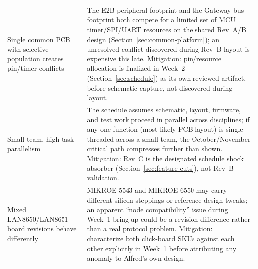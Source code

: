 \begin{center}
\begin{tabularx}{\linewidth}{@{}p{3.6cm} X@{}}
Single common PCB with selective population creates pin/timer conflicts & The E2B peripheral footprint and the Gateway bus footprint both compete for a limited set of MCU timer/SPI/UART resources on the shared Rev~A/B design (Section~\ref{sec:common-platform}); an unresolved conflict discovered during Rev~B layout is expensive this late. Mitigation: pin/resource allocation is finalized in Week~2 (Section~\ref{sec:schedule}) as its own reviewed artifact, before schematic capture, not discovered during layout. \\
Small team, high task parallelism & The schedule assumes schematic, layout, firmware, and test work proceed in parallel across disciplines; if any one function (most likely PCB layout) is single-threaded across a small team, the October/November critical path compresses further than shown. Mitigation: Rev~C is the designated schedule shock absorber (Section~\ref{sec:feature-cuts}), not Rev~B validation. \\
Mixed LAN8650/LAN8651 board revisions behave differently & MIKROE-5543 and MIKROE-6550 may carry different silicon steppings or reference-design tweaks; an apparent ``node compatibility'' issue during Week~1 bring-up could be a revision difference rather than a real protocol problem. Mitigation: characterize both click-board SKUs against each other explicitly in Week~1 before attributing any anomaly to Alfred's own design. \\
\bottomrule
\end{tabularx}
\end{center}
